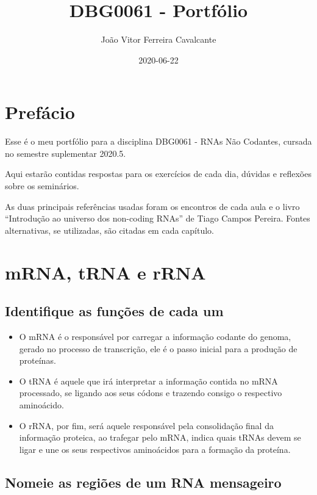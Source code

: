 \documentclass[
]{book}
\title{DBG0061 - Portfólio}
\author{João Vitor Ferreira Cavalcante}
\date{2020-06-22}
\begin{document}
\maketitle

{
\setcounter{tocdepth}{1}
\tableofcontents
}
\hypertarget{prefuxe1cio}{%
\chapter{Prefácio}\label{prefuxe1cio}}

Esse é o meu portfólio para a disciplina DBG0061 - RNAs Não Codantes, cursada no semestre suplementar 2020.5.

Aqui estarão contidas respostas para os exercícios de cada dia, dúvidas e reflexões sobre os seminários.

As duas principais referências usadas foram os encontros de cada aula e o livro ``Introdução ao universo dos non-coding RNAs'' de Tiago Campos Pereira. Fontes alternativas, se utilizadas, são citadas em cada capítulo.

\hypertarget{aula1}{%
\chapter{mRNA, tRNA e rRNA}\label{aula1}}

\hypertarget{identifique-as-funuxe7uxf5es-de-cada-um}{%
\section{Identifique as funções de cada um}\label{identifique-as-funuxe7uxf5es-de-cada-um}}

\begin{itemize}
\item
  O mRNA é o responsável por carregar a informação codante do genoma, gerado no processo de transcrição,
  ele é o passo inicial para a produção de proteínas.
\item
  O tRNA é aquele que irá interpretar a informação contida no mRNA processado, se ligando aos seus códons e trazendo consigo o respectivo aminoácido.
\item
  O rRNA, por fim, será aquele responsável pela consolidação final da informação proteica, ao trafegar pelo mRNA, indica quais tRNAs devem se ligar e une os seus respectivos aminoácidos para a formação da proteína.
\end{itemize}

\hypertarget{regioes}{%
\section{Nomeie as regiões de um RNA mensageiro}\label{regioes}}
\end{document}
